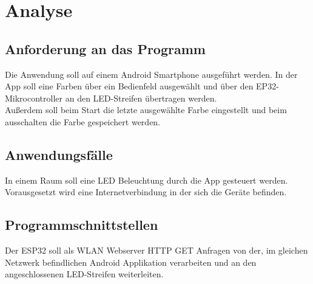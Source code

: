 \section{Analyse}
\subsection{Anforderung an das Programm}
Die Anwendung soll auf einem Android Smartphone ausgeführt werden.
In der App soll eine Farben über ein Bedienfeld ausgewählt und über den EP32- Mikrocontroller an den LED-Streifen übertragen werden. \\
Außerdem soll beim Start die letzte ausgewählte Farbe eingestellt und beim ausschalten die Farbe gespeichert werden.
\subsection{Anwendungsfälle}
In einem Raum soll eine LED Beleuchtung durch die App gesteuert werden. Vorausgesetzt wird eine Internetverbindung in der sich die Geräte befinden.
\subsection{Programmschnittstellen}
Der ESP32 soll als WLAN Webserver HTTP GET Anfragen von der, im gleichen Netzwerk befindlichen Android Applikation verarbeiten und an den angeschlossenen LED-Streifen weiterleiten.

